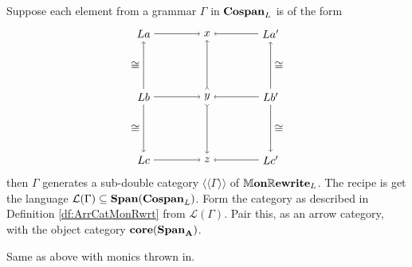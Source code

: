 \documentclass[ master_reopn ]{subfiles}
\begin{document}
\begin{thm}
	Suppose each element from a grammar $ \Gamma $ in $ \mathbf{Cospan}_{L} $ is of the form 
	\[
	\begin{tikzpicture}
	\node (a) at (-1,1) {$ L a $};
	\node (x) at (1,1) {$ x $};
	\node (a') at (3,1) {$ L a' $};
	\node (b) at (-1,-1) {$ L b $};
	\node (y) at (1,-1) {$ y $};
	\node (b') at (3,-1) {$ L b' $};
	\node (c) at (-1,-3) {$ L c $};
	\node (z) at (1,-3) {$ z $};
	\node (c') at (3,-3) {$ L c' $};
	\draw [->] (a) to (x);
	\draw [->] (a') to (x);
	\draw [->] (b) to (y);
	\draw [->] (b') to (y);
	\draw [->] (c) to (z);
	\draw [->] (c') to (z);
	\draw [->] (b) to node [left] {$ \cong $} (a);
	\draw [->] (b) to node [left] {$ \cong $} (c);
	\draw [>->] (y) to (x);
	\draw [>->] (y) to (z);
	\draw [->] (b') to node [right] {$ \cong $} (a');
	\draw [->] (b') to node [right] {$ \cong $} (c');
	\end{tikzpicture}
	\]
	then $ \Gamma $ generates a sub-double category $ \langle \langle \Gamma \rangle \rangle $ of $ \mathbb{M}\mathbf{on}\mathbb{R}\mathbf{ewrite}_{L} $.  The recipe is get the language $ \mathcal{L}(\Gamma)  \subseteq \mathbf{Span} {(\mathbf{Cospan}_{L})} $. Form the category as described in Definition \ref{df:ArrCatMonRwrt} from $ \mathcal{L}(\Gamma) $. Pair this, as an arrow category, with the object category $ \mathbf{core} (\mathbf{Span}_{\mathbf{A}}) $.
\end{thm}

\begin{thm}
	Same as above with monics thrown in.
\end{thm}
\end{document}
